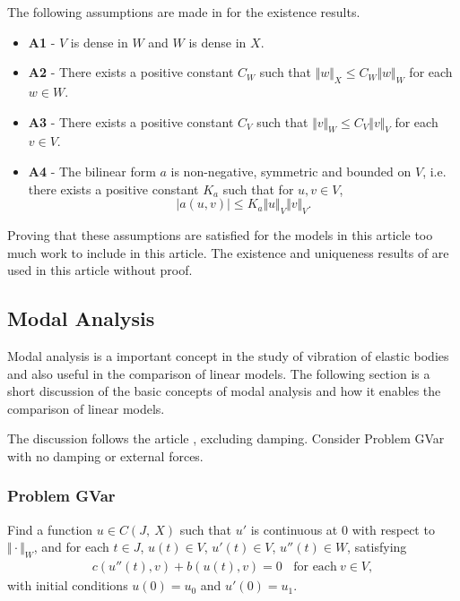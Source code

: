 		The following assumptions are made in \cite{VV02} for the existence results.
		\begin{itemize}
			\item[] \textbf{A1} - $V$ is dense in $W$ and $W$ is dense in $X$.

			\item[] \textbf{A2} - There exists a positive constant $C_{W}$ such that $\Vert w\Vert_{X} \leq C_{W}\Vert w\Vert_{W}$ for each $ w\in W$.

			\item[] \textbf{A3} - There exists a positive constant $C_{V}$ such that $\Vert v\Vert_{W} \leq C_{V}\Vert v\Vert_{V}$ for each $v \in V$.

			\item[] \textbf{A4} - The bilinear form $a$ is non-negative, symmetric and bounded on $V$, i.e. there exists a positive constant $K_a$ such that for $\displaystyle u,v \in V$, \[|a(u,v)| \leq K_a\Vert u \Vert_V \Vert v \Vert_V.\]
		\end{itemize}

		Proving that these assumptions are satisfied for the models in this article too much work to include in this article. The existence and uniqueness results of \cite{VV02} are used in this article without proof.

	\subsection*{Modal Analysis}
		Modal analysis is a important concept in the study of vibration of elastic bodies and also useful in the comparison of linear models. The following section is a short discussion of the basic concepts of modal analysis and how it enables the comparison of linear models.

		The discussion follows the article \cite{CVV18}, excluding damping. Consider Problem GVar with no damping or external forces.

		\subsubsection*{Problem GVar}\label{sssec:existence:ProblemGVar}
		Find a function $u \in C(J,\ X)$ such that $u'$ is continuous at $0$ with respect to $\Vert \cdot \Vert_{W}$, and for each $t \in J$, $u(t) \in V$, $u'(t) \in V$, $u''(t) \in W$, satisfying
		\begin{eqnarray}
		c(u''(t),v)+b(u(t),v) = 0 \ \ \ \ \textrm{for each} \ v \in V, \label{eq:existence:ProblemGVarHom}
		\end{eqnarray}
		with initial conditions $u(0) = u_0$ and $u'(0) = u_1$.

